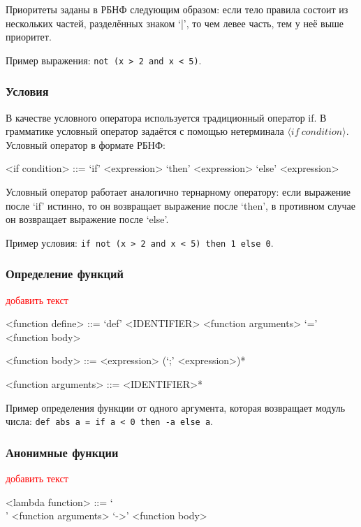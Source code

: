 \documentclass[12pt,a4paper,oneside]{extarticle}
\begin{document}
            Приоритеты заданы в РБНФ следующим образом: если тело правила состоит из нескольких частей, разделённых знаком `|', то чем левее часть, тем у неё выше приоритет.

            Пример выражения: \lstinline$not (x > 2 and x < 5)$.

        \subsubsection{Условия}
            В качестве условного оператора используется традиционный оператор if. В грамматике условный оператор задаётся с помощью нетерминала $\langle if~condition \rangle$. Условный оператор в формате РБНФ:
            \begin{grammar}
                <if condition> ::= `if' <expression> `then' <expression> `else' <expression>
            \end{grammar}
            Условный оператор работает аналогично тернарному оператору: если выражение после `if' истинно, то он возвращает выражение после `then', в противном случае он возвращает выражение после `else'.

            Пример условия: \lstinline$if not (x > 2 and x < 5) then 1 else 0$.

        \subsubsection{Определение функций}
            \textcolor{red}{добавить текст}
            \begin{grammar}
                <function define> ::= `def' <IDENTIFIER> <function arguments> `=' <function body>

                <function body> ::= <expression> (`;' <expression>)*

                <function arguments> ::= <IDENTIFIER>*
            \end{grammar}

            Пример определения функции от одного аргумента, которая возвращает модуль числа: \lstinline$def abs a = if a < 0 then -a else a$.

        \subsubsection{Анонимные функции}
            \textcolor{red}{добавить текст}
            \begin{grammar}
                <lambda function> ::= `\\' <function arguments> `->' <function body>
            \end{grammar}
\end{document}

